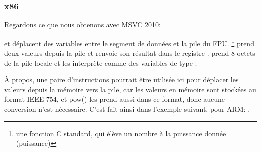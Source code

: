 \subsubsection{x86}

Regardons ce que nous obtenons avec MSVC 2010:




\FLD et \FSTP déplacent des variables entre le segment de données et la pile du FPU.
\footnote{une fonction C standard, qui élève un nombre à la puissance
donnée (puissance)} prend deux valeurs depuis la pile et renvoie son résultat dans
le registre .
\printf prend 8 octets de la pile locale et les interprète comme des variables de
type \Tdouble.

À propos, une paire d'instructions \MOV pourrait être utilisée ici pour déplacer
les valeurs depuis la mémoire vers la pile, car les valeurs en mémoire sont stockées
au format IEEE 754, et pow() les prend aussi dans ce format, donc aucune conversion
n'est nécessaire.
C'est fait ainsi dans l'exemple suivant, pour ARM: .


